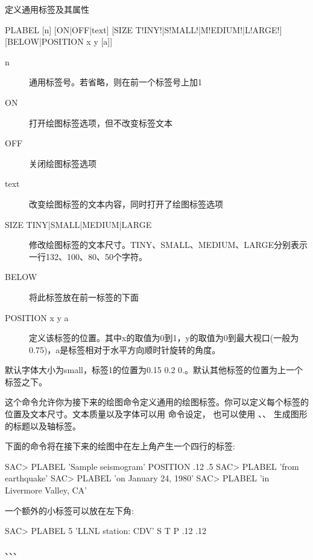 \label{cmd:plabel}

定义通用标签及其属性

\begin{SACSTX}
PLABEL [n] [ON|OFF|text] [SIZE T!INY!|S!MALL!|M!EDIUM!|L!ARGE!]
    [BELOW|POSITION x y [a]]
\end{SACSTX}

\begin{description}
\item [n] 通用标签号。若省略，则在前一个标签号上加1
\item [ON] 打开绘图标签选项，但不改变标签文本
\item [OFF] 关闭绘图标签选项
\item [text] 改变绘图标签的文本内容，同时打开了绘图标签选项
\item [SIZE TINY|SMALL|MEDIUM|LARGE] 修改绘图标签的文本尺寸。TINY、SMALL、MEDIUM、LARGE分别表示
    一行132、100、80、50个字符。
\item [BELOW] 将此标签放在前一标签的下面
\item [POSITION x y a] 定义该标签的位置。其中x的取值为0到1，y的取值为0到最大视口(一般为0.75)，a是标签相对于水平方向顺时针旋转的角度。
\end{description}

默认字体大小为small，标签1的位置为0.15 0.2 0.。默认其他标签的位置为上一个标签之下。

这个命令允许你为接下来的绘图命令定义通用的绘图标签。你可以定义每个标签的
位置及文本尺寸。文本质量以及字体可以用  命令设定，
也可以使用 、、
生成图形的标题以及轴标签。

下面的命令将在接下来的绘图中在左上角产生一个四行的标签:
\begin{SACCode}
SAC> PLABEL 'Sample seismogram' POSITION .12 .5
SAC> PLABEL 'from earthquake'
SAC> PLABEL 'on January 24, 1980'
SAC> PLABEL 'in Livermore Valley, CA'
\end{SACCode}

一个额外的小标签可以放在左下角:
\begin{SACCode}
SAC> PLABEL 5 'LLNL station: CDV' S T P .12 .12
\end{SACCode}

、、、
